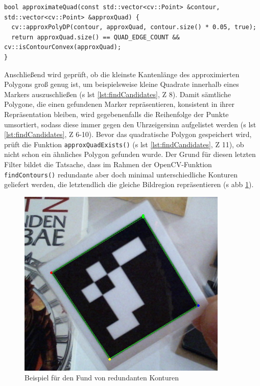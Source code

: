 \begin{lstlisting}[caption={Die Funktion \texttt{detectormarkerbased.cpp/approximateQuad();} approximiert aus einer gegeben Kontur ein Quadrat \acs{bzw} ein konvexes Polygon aus genau vier Punkten}, label={lst:approximateQuad}]
bool approximateQuad(const std::vector<cv::Point> &contour, std::vector<cv::Point> &approxQuad) {
  cv::approxPolyDP(contour, approxQuad, contour.size() * 0.05, true);
  return approxQuad.size() == QUAD_EDGE_COUNT && cv::isContourConvex(approxQuad);
}
\end{lstlisting}

\noindent Anschließend wird geprüft, ob die kleinste Kantenlänge des approximierten Polygons groß genug ist, um beispielsweise kleine Quadrate innerhalb eines Markers auszuschließen (\acs{s} \acs{lst} \ref{lst:findCandidates}, \acs{Z} 8). Damit sämtliche Polygone, die einen gefundenen Marker repräsentieren, konsistent in ihrer Repräsentation bleiben, wird gegebenenfalls die Reihenfolge der Punkte umsortiert, sodass diese immer gegen den Uhrzeigersinn aufgelistet werden (\acs{s} \acs{lst} \ref{lst:findCandidates}, \acs{Z} 6-10). Bevor das quadratische Polygon gespeichert wird, prüft die Funktion \texttt{approxQuadExists()} (\acs{s} \acs{lst} \ref{lst:findCandidates}, \acs{Z} 11), ob nicht schon ein ähnliches Polygon gefunden wurde. Der Grund für diesen letzten Filter bildet die Tatsache, dass im Rahmen der OpenCV-Funktion \texttt{findContours()} redundante aber doch minimal unterschiedliche Konturen geliefert werden, die letztendlich die gleiche Bildregion repräsentieren (\acs{s} \acs{abb} \ref{fig:DoubleExample}).

\begin{figure}[H]
\centering
\includegraphics[width=10cm]{Bilder/Implementierung/double.png}
\caption{Beispiel für den Fund von redundanten Konturen}
\label{fig:DoubleExample}
\end{figure}

